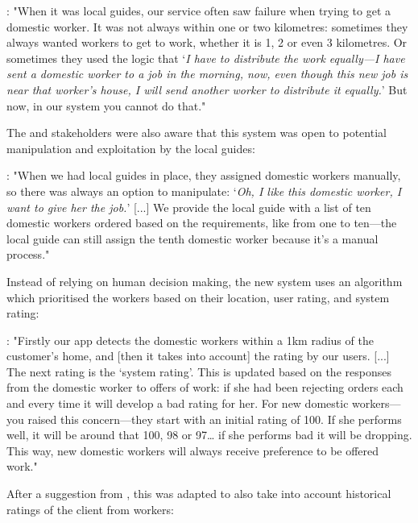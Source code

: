 \begin{displayquote}
\textbf{\PCTwo{}}: "When it was local guides, our service often saw failure when trying to get a domestic worker. It was not always within one or two kilometres: sometimes they always wanted workers to get to work, whether it is 1, 2 or even 3 kilometres. Or sometimes they used the logic that `\textit{I have to distribute the work equally---I have sent a domestic worker to a job in the morning, now, even though this new job is near that worker’s house, I will send another worker to distribute it equally.}’ But now, in our system you cannot do that."
\end{displayquote}

The \PC{} and \NGO{} stakeholders were also aware that this system was open to potential manipulation and exploitation by the local guides:

\begin{displayquote}
\textbf{\PCOne{}}: "When we had local guides in place, they assigned domestic workers manually, so there was always an option to manipulate: ‘\textit{Oh, I like this domestic worker, I want to give her the job.}’ [...] We provide the local guide with a list of ten domestic workers ordered based on the requirements, like from one to ten---the local guide can still assign the tenth domestic worker because it’s a manual process."
\end{displayquote}

Instead of relying on human decision making, the new system uses an algorithm which prioritised the workers based on their location, user rating, and system rating:

\begin{displayquote}
\textbf{\PCTwo{}}: "Firstly our app detects the domestic workers within a 1km radius of the customer’s home, and [then it takes into account] the rating by our users. [...] The next rating is the `system rating'. This is updated based on the responses from the domestic worker to offers of work: if she had been rejecting orders each and every time it will develop a bad rating for her. For new domestic workers---you raised this concern---they start with an initial rating of 100. If she performs well, it will be around that 100, 98 or 97… if she performs bad it will be dropping. This way, new domestic workers will always receive preference to be offered work."
\end{displayquote}

After a suggestion from \NGOOne{}, this was adapted to also take into account historical ratings of the client from workers: 


